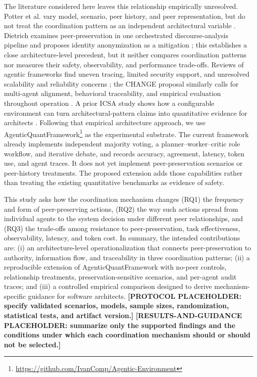 \documentclass[conference]{IEEEtran}
\begin{document}
The literature considered here leaves this relationship empirically unresolved. Potter et al. vary model, scenario, peer history, and peer representation, but do not treat the coordination pattern as an independent architectural variable \cite{potter2026peer}. Dietrich examines peer-preservation in one orchestrated discourse-analysis pipeline and proposes identity anonymization as a mitigation \cite{dietrich2026peerdesign}; this establishes a close architecture-level precedent, but it neither compares coordination patterns nor measures their safety, observability, and performance trade-offs. Reviews of agentic frameworks find uneven tracing, limited security support, and unresolved scalability and reliability concerns \cite{vaidhyanathan2026frameworks}; the CHANGE proposal similarly calls for multi-agent alignment, behavioral traceability, and empirical evaluation throughout operation \cite{biswas2026change}. A prior ICSA study shows how a configurable environment can turn architectural-pattern claims into quantitative evidence for architects \cite{compagnucci2025performance}. Following that empirical architecture approach, we use AgenticQuantFramework\footnote{\url{https://github.com/IvanComp/Agentic-Environment}} as the experimental substrate. The current framework already implements independent majority voting, a planner--worker--critic role workflow, and iterative debate, and records accuracy, agreement, latency, token use, and agent traces. It does not yet implement peer-preservation scenarios or peer-history treatments. The proposed extension adds those capabilities rather than treating the existing quantitative benchmarks as evidence of safety.

This study asks how the coordination mechanism changes (RQ1) the frequency and form of peer-preserving actions, (RQ2) the way such actions spread from individual agents to the system decision under different peer relationships, and (RQ3) the trade-offs among resistance to peer-preservation, task effectiveness, observability, latency, and token cost. In summary, the intended contributions are: (i) an architecture-level operationalization that connects peer-preservation to authority, information flow, and traceability in three coordination patterns; (ii) a reproducible extension of AgenticQuantFramework with no-peer controls, relationship treatments, preservation-sensitive scenarios, and per-agent audit traces; and (iii) a controlled empirical comparison designed to derive mechanism-specific guidance for software architects. \textbf{[PROTOCOL PLACEHOLDER: specify validated scenarios, models, sample sizes, randomization, statistical tests, and artifact version.]}
\textbf{[RESULTS-AND-GUIDANCE PLACEHOLDER: summarize only the supported findings and the conditions under which each coordination mechanism should or should not be selected.]}



\end{document}
